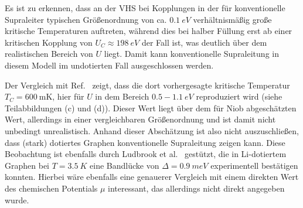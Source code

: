 Es ist zu erkennen, dass an der VHS bei Kopplungen in der für konventionelle Supraleiter typischen Größenordnung von ca. $\qty{0.1}{eV}$ verhältnismäßig große kritische Temperaturen auftreten, während dies bei halber Füllung erst ab einer kritischen Kopplung von $U_C \approx \qty{198}{eV}$ der Fall ist, was deutlich über dem realistischen Bereich von $U$ liegt.
Damit kann konventionelle Supraleitung in diesem Modell im undotierten Fall ausgeschlossen werden.

Der Vergleich mit Ref.~\cite{herrera_topological_2024} zeigt, dass die dort vorhergesagte kritische Temperatur $T_C = \qty{600}{\milli\kelvin}$, hier für $U$ in dem Bereich $\num{0.5} - \qty{1.1}{eV}$ reproduziert wird (siehe Teilabbildungen (c) und (d)).
Dieser Wert liegt über dem für Niob abgeschätzten Wert, allerdings in einer vergleichbaren Größenordnung und ist damit nicht unbedingt unrealistisch. 
Anhand dieser Abschätzung ist also nicht auszuschließen, dass (stark) dotiertes Graphen konventionelle Supraleitung zeigen kann.
Diese Beobachtung ist ebenfalls durch Ludbrook et al.\ \cite{ludbrook_evidence_2015} gestützt, die in Li-dotiertem Graphen bei $T = \qty{3.5}{K}$ eine Bandlücke von $\Delta = \qty{0.9}{meV}$ experimentell bestätigen konnten.
Hierbei wäre ebenfalls eine genauerer Vergleich mit einem direkten Wert des chemischen Potentials $\mu$ interessant, das allerdings nicht direkt angegeben wurde.

